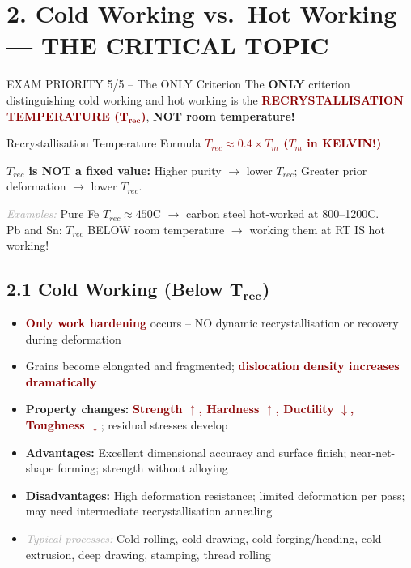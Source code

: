 \documentclass[11pt,a4paper]{article}
\newcommand{\mysec}[1]{\section*{#1}}
\newcommand{\mysubsec}[1]{\subsection*{#1}}
\newcommand{\CRIT}[1]{\textcolor{DarkRed}{\textbf{#1}}}
\newcommand{\KEY}[1]{\textcolor{SecondaryDark}{\textbf{#1}}}
\newcommand{\EXA}[1]{\textcolor{DarkGray}{\textit{#1}}}
\begin{document}
\newpage
\mysec{2. Cold Working vs.\ Hot Working --- THE CRITICAL TOPIC}

\begin{critbox}{EXAM PRIORITY 5/5 -- The ONLY Criterion}
The \textbf{ONLY} criterion distinguishing cold working and hot working is the \CRIT{RECRYSTALLISATION TEMPERATURE ($\mathbf{T_{rec}}$)}, \textbf{NOT room temperature!}
\end{critbox}

\begin{formbox}{Recrystallisation Temperature Formula}
\centering\Large
\CRIT{$T_{rec} \approx 0.4 \times T_m$ \hspace{0.5cm} ($T_m$ in KELVIN!)}

\vspace{6pt}
\normalsize\raggedright
\KEY{$T_{rec}$ is NOT a fixed value:} Higher purity $\to$ lower $T_{rec}$; Greater prior deformation $\to$ lower $T_{rec}$.

\EXA{Examples:} Pure Fe $T_{rec}\approx 450$\textdegree C $\to$ carbon steel hot-worked at 800--1200\textdegree C.\\
Pb and Sn: $T_{rec}$ BELOW room temperature $\to$ working them at RT IS hot working!
\end{formbox}

\mysubsec{2.1 Cold Working (Below $\mathbf{T_{rec}}$)}

\begin{itemize}[leftmargin=*,nosep]
    \item \CRIT{Only work hardening} occurs -- NO dynamic recrystallisation or recovery during deformation
    \item Grains become elongated and fragmented; \CRIT{dislocation density increases dramatically}
    \item \textbf{Property changes:} \CRIT{Strength $\uparrow$, Hardness $\uparrow$, Ductility $\downarrow$, Toughness $\downarrow$}; residual stresses develop
    \item \textbf{Advantages:} Excellent dimensional accuracy and surface finish; near-net-shape forming; strength without alloying
    \item \textbf{Disadvantages:} High deformation resistance; limited deformation per pass; may need intermediate recrystallisation annealing
    \item \EXA{Typical processes:} Cold rolling, cold drawing, cold forging/heading, cold extrusion, deep drawing, stamping, thread rolling
\end{itemize}
\end{document}
